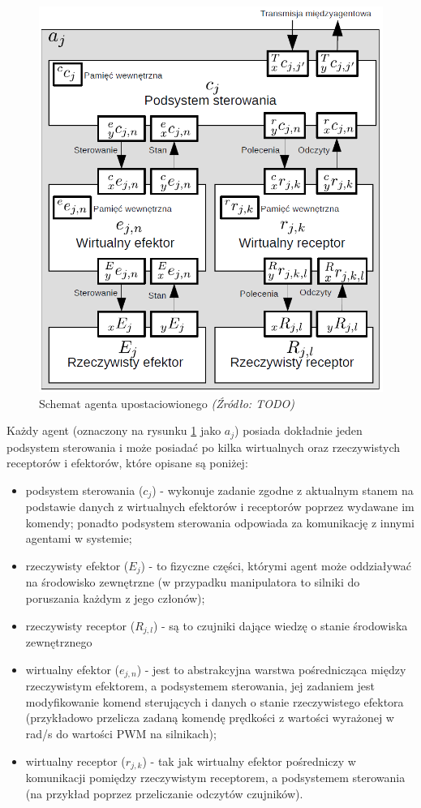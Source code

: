 \documentclass[a4paper, 12pt, twoside]{article}
\begin{document}
\begin{figure}[hbt!]
\centering
\includegraphics[width=0.6\linewidth]{images/embodied_agent.png}
\caption{Schemat agenta upostaciowionego \textit{ (Źródło: TODO) } }
\label{fig:embodied_agent}
\end{figure}

Każdy agent (oznaczony na rysunku \ref{fig:embodied_agent} jako $a_j$) posiada dokładnie jeden podsystem sterowania i może posiadać po kilka wirtualnych oraz rzeczywistych receptorów i efektorów, które opisane są poniżej:

\begin{itemize}
\item podsystem sterowania ($c_j$) - wykonuje zadanie zgodne z aktualnym stanem na podstawie danych z wirtualnych efektorów i receptorów poprzez wydawane im komendy; ponadto podsystem sterowania odpowiada za komunikację z innymi agentami w systemie;
\item rzeczywisty efektor ($E_j$) - to fizyczne części, którymi agent może oddziaływać na środowisko zewnętrzne (w przypadku manipulatora to silniki do poruszania każdym z jego członów);
\item rzeczywisty receptor ($R_{j,l}$) - są to czujniki dające wiedzę o stanie środowiska zewnętrznego
\item wirtualny efektor ($e_{j,n}$) - jest to abstrakcyjna warstwa pośrednicząca między rzeczywistym efektorem, a podsystemem sterowania, jej zadaniem jest modyfikowanie komend sterujących i danych o stanie rzeczywistego efektora (przykładowo przelicza zadaną komendę prędkości z wartości wyrażonej w rad/s do wartości PWM na silnikach);
\item wirtualny receptor ($r_{j,k}$) - tak jak wirtualny efektor pośredniczy w komunikacji pomiędzy rzeczywistym receptorem, a podsystemem sterowania (na przykład poprzez przeliczanie odczytów czujników).
\end{itemize}
\end{document}
